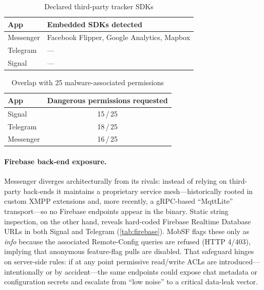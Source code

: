 \documentclass[a4paper,12pt]{report}
\begin{document}
\begin{table}[htbp]
  \centering
  \caption{Declared third-party tracker SDKs}
  \label{tab:trackers}
  \begin{tabular}{|l|p{7cm}|}
    \hline
    \textbf{App} & \textbf{Embedded SDKs detected} \\ \hline
    Messenger & Facebook Flipper, Google Analytics, Mapbox \\ \hline
    Telegram  & — \\ \hline
    Signal    & — \\ \hline
  \end{tabular}
\end{table}

\begin{table}[htbp]
  \centering
  \caption{Overlap with 25 malware-associated permissions}
  \label{tab:perm-malware}
  \begin{tabular}{|l|c|}
    \hline
    \textbf{App} & \textbf{Dangerous permissions requested} \\ \hline
    Signal    & 15\,/\,25 \\ \hline
    Telegram  & 18\,/\,25 \\ \hline
    Messenger & 16\,/\,25 \\ \hline
  \end{tabular}
\end{table}

\paragraph{Firebase back-end exposure.}

Messenger diverges architecturally from its rivals: instead of relying on third-party back-ends it maintains a proprietary service mesh—historically rooted in custom XMPP extensions and, more recently, a gRPC-based “MqttLite” transport—so no Firebase endpoints appear in the binary.
Static string inspection, on the other hand, reveals hard-coded Firebase Realtime Database URLs in both Signal and Telegram (\autoref{tab:firebase}). MobSF flags these only as \textit{info} because the associated Remote-Config queries are refused (HTTP 4/403), implying that anonymous feature-flag pulls are disabled. That safeguard hinges on server-side rules: if at any point permissive read/write ACLs are introduced—intentionally or by accident—the same endpoints could expose chat metadata or configuration secrets and escalate from “low noise” to a critical data-leak vector.
\end{document}
